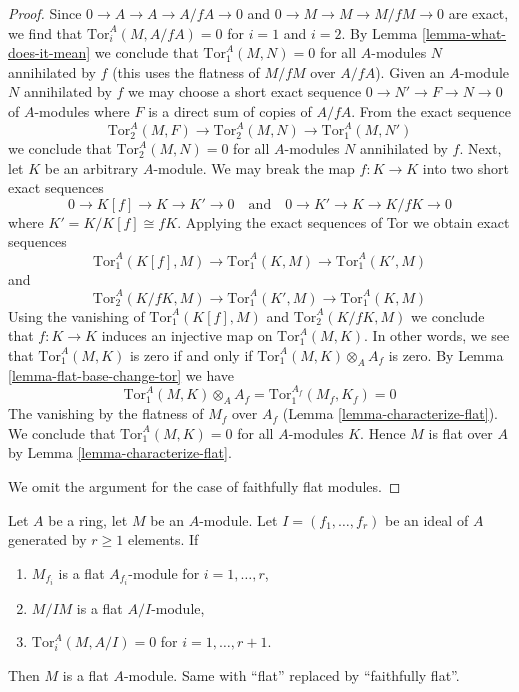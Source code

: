 \begin{proof}
Since $0 \to A \to A \to A/fA \to 0$ and $0 \to M \to M \to M/fM \to 0$ are
exact, we find that $\text{Tor}_i^A(M, A/fA) = 0$ for $i = 1$ and $i = 2$.
By Lemma \ref{lemma-what-does-it-mean} we conclude that
$\text{Tor}_1^A(M, N) = 0$ for all $A$-modules $N$ annihilated by $f$
(this uses the flatness of $M/fM$ over $A/fA$).
Given an $A$-module $N$ annihilated by $f$ we may
choose a short exact sequence $0 \to N' \to F \to N \to 0$ of $A$-modules
where $F$ is a direct sum of copies of $A/fA$. From the exact sequence
$$
\text{Tor}_2^A(M, F) \to
\text{Tor}_2^A(M, N) \to
\text{Tor}_1^A(M, N')
$$
we conclude that $\text{Tor}_2^A(M, N) = 0$ for all $A$-modules
$N$ annihilated by $f$. Next, let $K$ be an arbitrary $A$-module.
We may break the map $f : K \to K$ into two short exact sequences
$$
0 \to K[f] \to K \to K' \to 0
\quad\text{and}\quad
0 \to K' \to K \to K/fK \to 0
$$
where $K' = K/K[f] \cong fK$. Applying the exact sequences of Tor we
obtain exact sequences
$$
\text{Tor}_1^A(K[f], M) \to
\text{Tor}_1^A(K, M) \to
\text{Tor}_1^A(K', M)
$$
and
$$
\text{Tor}_2^A(K/fK, M) \to
\text{Tor}_1^A(K', M) \to
\text{Tor}_1^A(K, M)
$$
Using the vanishing of
$\text{Tor}_1^A(K[f], M)$ and
$\text{Tor}_2^A(K/fK, M)$
we conclude that $f : K \to K$ induces an injective map on
$\text{Tor}^A_1(M, K)$. In other words, we see that $\text{Tor}^A_1(M, K)$
is zero if and only if $\text{Tor}^A_1(M, K) \otimes_A A_f$ is zero.
By Lemma \ref{lemma-flat-base-change-tor} we have
$$
\text{Tor}^A_1(M, K) \otimes_A A_f = \text{Tor}^{A_f}_1(M_f, K_f)  = 0
$$
The vanishing by the flatness of $M_f$ over $A_f$
(Lemma \ref{lemma-characterize-flat}).
We conclude that $\text{Tor}_1^A(M, K) = 0$
for all $A$-modules $K$. Hence
$M$ is flat over $A$ by Lemma \ref{lemma-characterize-flat}.

\medskip\noindent
We omit the argument for the case of faithfully flat modules.
\end{proof}

\begin{lemma}
\label{lemma-flatness-scallop-pre}
Let $A$ be a ring, let $M$ be an $A$-module. Let $I = (f_1, \ldots, f_r)$
be an ideal of $A$ generated by $r \geq 1$ elements. If
\begin{enumerate}
\item $M_{f_i}$ is a flat $A_{f_i}$-module for $i = 1, \ldots, r$,
\item $M/IM$ is a flat $A/I$-module,
\item $\text{Tor}_i^A(M, A/I) = 0$ for $i = 1, \ldots, r + 1$.
\end{enumerate}
Then $M$ is a flat $A$-module. Same with ``flat'' replaced by
``faithfully flat''.
\end{lemma}

